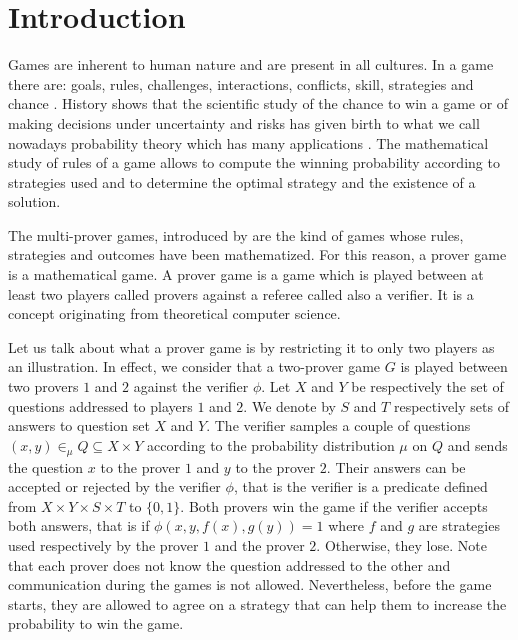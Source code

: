 \chapter{Introduction}

Games are inherent to  human nature and are present in all cultures.  In a game there are: goals, rules, challenges, interactions, conflicts, skill, strategies and chance \citep{mcgonigal2011reality, crawford1984art}.
History shows
that the scientific study of the chance to win a game or of making decisions under uncertainty and risks has given birth to what we call nowadays probability theory which has many applications
\citep{freund2012introduction}. The mathematical study of rules of a game allows to compute the winning probability according to strategies used and to determine the optimal strategy and the existence of a solution.

The multi-prover games, 
introduced by \cite*{ben1988multi} are the kind 
of  games whose rules, strategies and outcomes  have been mathematized. For this reason, a prover game is a mathematical game. A prover game is a game which is played between at least two players called provers against a referee called also a verifier. It is a concept originating from theoretical computer science.  

Let us talk about what a prover game is by restricting it to only two players as an illustration.  In effect, we consider that a two-prover game $G$ is played between two provers $1$ and $2$ against the verifier $\phi$.   Let $X$ and $Y$ be respectively the set of questions addressed to players $1$ and $2.$ We denote by $S$ and $T$ respectively  sets of answers to question set $X$ and $Y$. The verifier samples a couple of questions $(x,y) \in_{\mu} Q \subseteq X \times Y$ according to the  probability distribution $\mu$ on $Q$ and sends the question $x$ to the prover $1$ and $y$ to the prover $2.$ Their answers can be accepted or rejected by the verifier $\phi$, that is the verifier is a predicate defined from $X \times Y \times S \times T$ to $\{0,1\}.$ Both  provers win the game if the verifier accepts both answers, that is if $\phi (x,y,f(x),g(y))=1$ where $f$ and $g$ are  strategies used respectively by the prover $1$ and the prover $2.$ Otherwise, they lose.
Note that each prover does not know the question addressed to the other and communication during the games is not allowed. Nevertheless, before the game starts, they are allowed to agree on a strategy that can help them to increase the probability to win  the game.

